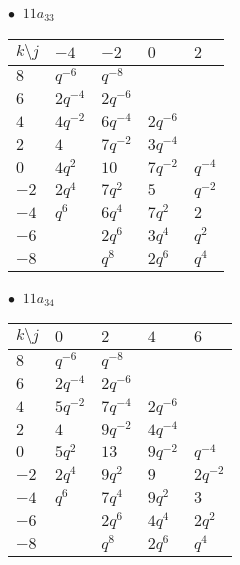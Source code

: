 \begin{minipage}{\linewidth}
$\bullet\ $ $11a_{33}$ \vspace{0.5em} \\
\begin{tabular}{l|llll}
$k \setminus j$ & $-4$ & $-2$ & $0$ & $2$ \\
\hline
$8$ & $q^{-6}$ & $q^{-8}$ &  &  \\
$6$ & $2q^{-4}$ & $2q^{-6}$ &  &  \\
$4$ & $4q^{-2}$ & $6q^{-4}$ & $2q^{-6}$ &  \\
$2$ & $4$ & $7q^{-2}$ & $3q^{-4}$ &  \\
$0$ & $4q^{2}$ & $10$ & $7q^{-2}$ & $q^{-4}$ \\
$-2$ & $2q^{4}$ & $7q^{2}$ & $5$ & $q^{-2}$ \\
$-4$ & $q^{6}$ & $6q^{4}$ & $7q^{2}$ & $2$ \\
$-6$ &  & $2q^{6}$ & $3q^{4}$ & $q^{2}$ \\
$-8$ &  & $q^{8}$ & $2q^{6}$ & $q^{4}$ \\
\end{tabular}
\vspace{2em}
\end{minipage}
%
\begin{minipage}{\linewidth}
$\bullet\ $ $11a_{34}$ \vspace{0.5em} \\
\begin{tabular}{l|llll}
$k \setminus j$ & $0$ & $2$ & $4$ & $6$ \\
\hline
$8$ & $q^{-6}$ & $q^{-8}$ &  &  \\
$6$ & $2q^{-4}$ & $2q^{-6}$ &  &  \\
$4$ & $5q^{-2}$ & $7q^{-4}$ & $2q^{-6}$ &  \\
$2$ & $4$ & $9q^{-2}$ & $4q^{-4}$ &  \\
$0$ & $5q^{2}$ & $13$ & $9q^{-2}$ & $q^{-4}$ \\
$-2$ & $2q^{4}$ & $9q^{2}$ & $9$ & $2q^{-2}$ \\
$-4$ & $q^{6}$ & $7q^{4}$ & $9q^{2}$ & $3$ \\
$-6$ &  & $2q^{6}$ & $4q^{4}$ & $2q^{2}$ \\
$-8$ &  & $q^{8}$ & $2q^{6}$ & $q^{4}$ \\
\end{tabular}
\vspace{2em}
\end{minipage}
%
